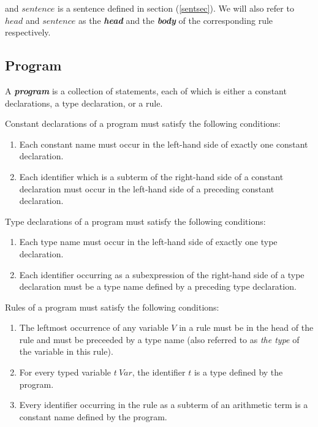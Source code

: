 \documentclass[a4paper,10pt]{article}
\begin{document}
and $sentence$ is a sentence defined in section (\ref{sentsec}).
We will also refer to $head$ and $sentence$ as the \textit{\textbf{head}} and the \textit{\textbf{body}} of the corresponding rule respectively.
 
\subsection{Program} \label{progdef}
A \textbf{\textit{program}} is a collection of statements, each of which is either a constant declarations, a
 type declaration, or a rule.

\noindent\vspace{0.2cm}

Constant declarations of a program must satisfy the following conditions:
\begin{enumerate}
\item Each constant name must occur in the left-hand side of exactly one constant declaration.
\item Each identifier which is a subterm of the right-hand side of a constant declaration must occur in the left-hand side of a preceding constant declaration.   

\end{enumerate}



Type declarations of a program must satisfy the following conditions:
\begin{enumerate}
\item Each type name must occur in the left-hand side of exactly one type declaration.
\item Each identifier occurring as  a subexpression of the right-hand side of a  type declaration must be a type name defined by a preceding type declaration. 
\end{enumerate}


Rules of a program must satisfy the following conditions:

\begin{enumerate}


\item The leftmost occurrence of any variable  $V$ in a rule must be in the head of the rule and must be preceeded by a type name (also referred to as \textit{the type} of the variable in this rule).

\item For every typed variable $t~Var$, the identifier $t$ is a type defined by the program.
\item Every identifier  occurring in the rule as a subterm of an arithmetic term is a constant name defined by the program.
\end{enumerate}
\end{document}
